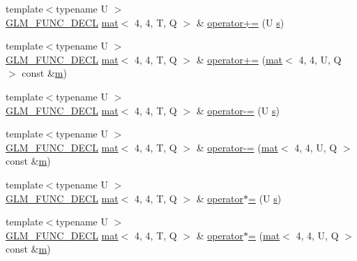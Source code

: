 \begin{DoxyCompactItemize}
\item 
{\footnotesize template$<$typename U $>$ }\\\hyperlink{setup_8hpp_ab2d052de21a70539923e9bcbf6e83a51}{G\+L\+M\+\_\+\+F\+U\+N\+C\+\_\+\+D\+E\+CL} \hyperlink{structglm_1_1mat}{mat}$<$ 4, 4, T, Q $>$ \& \hyperlink{structglm_1_1mat_3_014_00_014_00_01_t_00_01_q_01_4_a0f815cdd7d2c4c961195e562a57b588b}{operator+=} (U \hyperlink{_s_d_l__opengl_8h_a4af680a6c683f88ed67b76f207f2e6e4}{s})
\item 
{\footnotesize template$<$typename U $>$ }\\\hyperlink{setup_8hpp_ab2d052de21a70539923e9bcbf6e83a51}{G\+L\+M\+\_\+\+F\+U\+N\+C\+\_\+\+D\+E\+CL} \hyperlink{structglm_1_1mat}{mat}$<$ 4, 4, T, Q $>$ \& \hyperlink{structglm_1_1mat_3_014_00_014_00_01_t_00_01_q_01_4_adcd94cc67c06e39342acf446e1859b52}{operator+=} (\hyperlink{structglm_1_1mat}{mat}$<$ 4, 4, U, Q $>$ const \&\hyperlink{_s_d_l__opengl__glext_8h_af593500c283bf1a787a6f947f503a5c2}{m})
\item 
{\footnotesize template$<$typename U $>$ }\\\hyperlink{setup_8hpp_ab2d052de21a70539923e9bcbf6e83a51}{G\+L\+M\+\_\+\+F\+U\+N\+C\+\_\+\+D\+E\+CL} \hyperlink{structglm_1_1mat}{mat}$<$ 4, 4, T, Q $>$ \& \hyperlink{structglm_1_1mat_3_014_00_014_00_01_t_00_01_q_01_4_ae97fef5ac1d3b3b1b51ab496c7c02877}{operator-\/=} (U \hyperlink{_s_d_l__opengl_8h_a4af680a6c683f88ed67b76f207f2e6e4}{s})
\item 
{\footnotesize template$<$typename U $>$ }\\\hyperlink{setup_8hpp_ab2d052de21a70539923e9bcbf6e83a51}{G\+L\+M\+\_\+\+F\+U\+N\+C\+\_\+\+D\+E\+CL} \hyperlink{structglm_1_1mat}{mat}$<$ 4, 4, T, Q $>$ \& \hyperlink{structglm_1_1mat_3_014_00_014_00_01_t_00_01_q_01_4_a63a67f742e051a407c621365d67af38a}{operator-\/=} (\hyperlink{structglm_1_1mat}{mat}$<$ 4, 4, U, Q $>$ const \&\hyperlink{_s_d_l__opengl__glext_8h_af593500c283bf1a787a6f947f503a5c2}{m})
\item 
{\footnotesize template$<$typename U $>$ }\\\hyperlink{setup_8hpp_ab2d052de21a70539923e9bcbf6e83a51}{G\+L\+M\+\_\+\+F\+U\+N\+C\+\_\+\+D\+E\+CL} \hyperlink{structglm_1_1mat}{mat}$<$ 4, 4, T, Q $>$ \& \hyperlink{structglm_1_1mat_3_014_00_014_00_01_t_00_01_q_01_4_a431d493d66da8eeb6f7b94f97e40f420}{operator$\ast$=} (U \hyperlink{_s_d_l__opengl_8h_a4af680a6c683f88ed67b76f207f2e6e4}{s})
\item 
{\footnotesize template$<$typename U $>$ }\\\hyperlink{setup_8hpp_ab2d052de21a70539923e9bcbf6e83a51}{G\+L\+M\+\_\+\+F\+U\+N\+C\+\_\+\+D\+E\+CL} \hyperlink{structglm_1_1mat}{mat}$<$ 4, 4, T, Q $>$ \& \hyperlink{structglm_1_1mat_3_014_00_014_00_01_t_00_01_q_01_4_a2b2e2159f3d8ae83016b90f092a3be1f}{operator$\ast$=} (\hyperlink{structglm_1_1mat}{mat}$<$ 4, 4, U, Q $>$ const \&\hyperlink{_s_d_l__opengl__glext_8h_af593500c283bf1a787a6f947f503a5c2}{m})

\end{DoxyCompactItemize}
